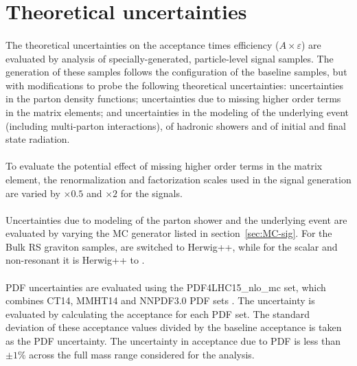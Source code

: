 \section{Theoretical uncertainties}
\label{sec:boosted-systematics-theory}
\paragraph{}
The theoretical uncertainties on the acceptance times efficiency ($A\times\varepsilon$) are evaluated by analysis of specially-generated, particle-level signal samples. 
The generation of these samples follows the configuration of the baseline samples, but with modifications to probe the following theoretical uncertainties: uncertainties in the parton density functions; uncertainties due to missing higher order terms in the matrix elements; and uncertainties in the modeling of the underlying event (including multi-parton interactions), of hadronic showers and of initial and final state radiation.

\paragraph{}
To evaluate the potential effect of missing higher order terms in the matrix element, the renormalization and factorization scales used in the signal generation are varied by $\times 0.5$ and $\times 2$ for the signals. 

\paragraph{}
Uncertainties due to modeling of the parton shower and the underlying event are evaluated by varying the MC generator listed in section~\ref{sec:MC-sig}. 
For the Bulk RS graviton samples,  are switched to Herwig++, while for the scalar and non-resonant it is Herwig++ to .

\paragraph{}
PDF uncertainties are evaluated using the PDF4LHC15\_nlo\_mc set, which combines CT14, MMHT14 and NNPDF3.0 PDF sets \cite{0954-3899-43-2-023001}. 
The uncertainty is evaluated by calculating the acceptance for each PDF set. 
The standard deviation of these acceptance values divided by the baseline acceptance is taken as the PDF uncertainty. 
The uncertainty in acceptance due to PDF is less than $\pm1\%$ across the full mass range considered for the analysis.

